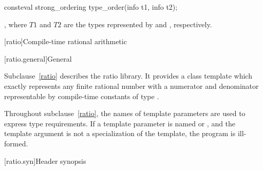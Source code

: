 %
\begin{itemdecl}
consteval strong_ordering type_order(info t1, info t2);
\end{itemdecl}

\begin{itemdescr}
\pnum
\returns
{},
where $\mathit{T1}$ and $\mathit{T2}$ are the types
represented by  and , respectively.
\end{itemdescr}

[ratio]{Compile-time rational arithmetic}

[ratio.general]{General}

\pnum
{}%
Subclause~\ref{ratio} describes the ratio library. It provides a class template
 which exactly represents any finite rational number with a
numerator and denominator representable by compile-time constants of type
.

\pnum
Throughout subclause~\ref{ratio}, the names of template parameters are used to express
type requirements. If a template parameter is named  or ,
and the template argument is not a specialization of the  template,
the program is ill-formed.

[ratio.syn]{Header  synopsis}

